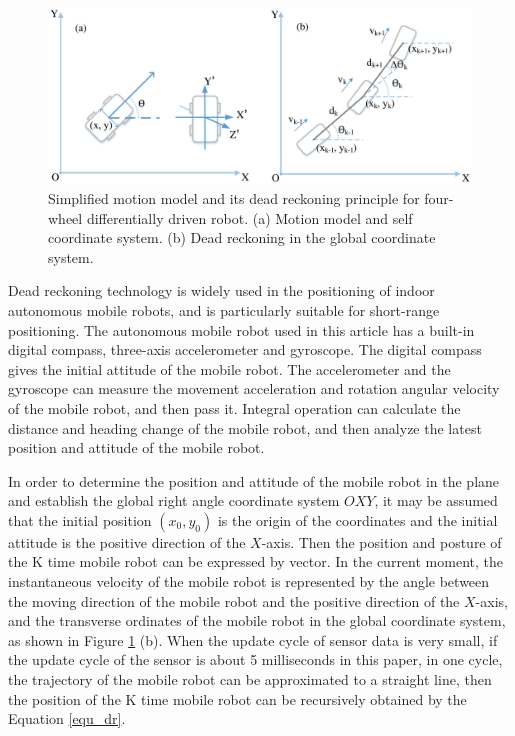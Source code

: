 \documentclass{llncs}
\begin{document}
\begin{figure}[!htbp]
	\centering
	\includegraphics[width=4.7in]{RobotMatch-MotionModel}
	\caption{Simplified motion model and its dead reckoning principle for four-wheel differentially driven robot. (a) Motion model and self coordinate system. (b) Dead reckoning in the global coordinate system.}
	\label{fig-model-dr}
\end{figure}

Dead reckoning technology is widely used in the positioning of indoor autonomous mobile robots, and is particularly suitable for short-range positioning. The autonomous mobile robot used in this article has a built-in digital compass, three-axis accelerometer and gyroscope. The digital compass gives the initial attitude of the mobile robot. The accelerometer and the gyroscope can measure the movement acceleration and rotation angular velocity of the mobile robot, and then pass it. Integral operation can calculate the distance and heading change of the mobile robot, and then analyze the latest position and attitude of the mobile robot.

In order to determine the position and attitude of the mobile robot in the plane and establish the global right angle coordinate system $OXY$, it may be assumed that the initial position $(x_0, y_0)$ is the origin of the coordinates and the initial attitude is the positive direction of the $X$-axis. Then the position and posture of the K time mobile robot can be expressed by vector. In the current moment, the instantaneous velocity of the mobile robot is represented by the angle between the moving direction of the mobile robot and the positive direction of the $X$-axis, and the transverse ordinates of the mobile robot in the global coordinate system, as shown in Figure \ref{fig-model-dr} (b). When the update cycle of sensor data is very small, if the update cycle of the sensor is about 5 milliseconds in this paper, in one cycle, the trajectory of the mobile robot can be approximated to a straight line, then the position of the K time mobile robot can be recursively obtained by the Equation \ref{equ_dr}.
\end{document}
